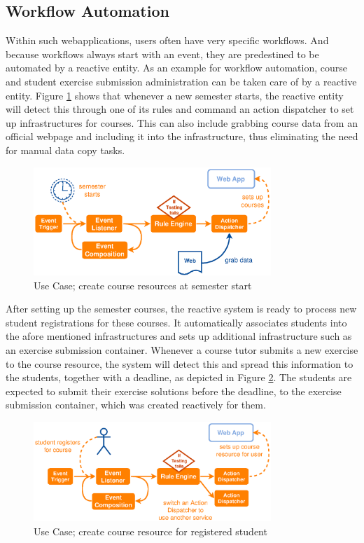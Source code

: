 \subsection{Workflow Automation}
Within such \textrm{\glspl{webapplication}}, users often have very specific workflows.
And because workflows always start with an event, they are predestined to be automated by a reactive entity.
As an example for workflow automation, course and student exercise submission administration can be taken care of by a reactive entity.
Figure \ref{fig:ProBinderCourseSetup} shows that whenever a new semester starts, the reactive entity will detect this through one of its rules and command an action dispatcher to set up infrastructures for courses.
This can also include grabbing course data from an official webpage and including it into the infrastructure, thus eliminating the need for manual data copy tasks.
\begin{figure}[!ht]
  \centering
  \includegraphics[width=0.8\textwidth]{figures/ProBinderCourseSetup}
  \caption{Use Case; create course resources at semester start}
  \label{fig:ProBinderCourseSetup}
\end{figure}

After setting up the semester courses, the reactive system is ready to process new student registrations for these courses.
It automatically associates students into the afore mentioned infrastructures and sets up additional infrastructure such as an exercise submission container.
Whenever a course tutor submits a new exercise to the course resource, the system will detect this and spread this information to the students, together with a deadline, as depicted in Figure \ref{fig:ProBinderStudentRegisters}.
The students are expected to submit their exercise solutions before the deadline, to the exercise submission container, which was created reactively for them.
\begin{figure}[!ht]
  \centering
  \includegraphics[width=0.8\textwidth]{figures/ProBinderStudentRegisters}
  \caption{Use Case; create course resource for registered student}
  \label{fig:ProBinderStudentRegisters}
\end{figure}

